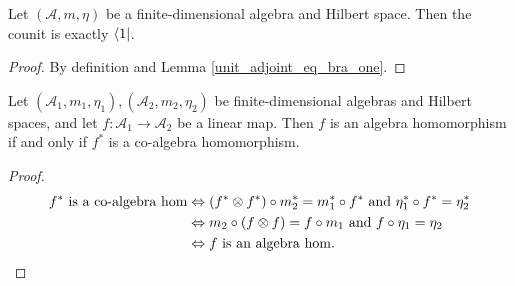  \begin{lemma}\label{counit_eq_bra_one}
  \leanok
  Let $(\mathcal{A},m,\eta)$ be a finite-dimensional algebra and Hilbert space. Then the counit is exactly $\left\langle1\right\rvert$.
 \end{lemma}
 \begin{proof}\leanok
  By definition and Lemma \ref{unit_adjoint_eq_bra_one}.
 \end{proof}

 \begin{proposition}\label{isAlgHom_iff_adjoint_isCoalgHom}
  \leanok
  Let $(\mathcal{A}_1,m_1,\eta_1),(\mathcal{A}_2,m_2,\eta_2)$ be finite-dimensional algebras and Hilbert spaces, and let $f\colon\mathcal{A}_1\to\mathcal{A}_2$ be a linear map. Then $f$ is an algebra homomorphism if and only if $f^*$ is a co-algebra homomorphism.
 \end{proposition}
 \begin{proof}\leanok
  \begin{align*}
   f^*\text{ is a co-algebra hom} &\Leftrightarrow (f^*\otimes f^*)\circ m_2^*=m_1^*\circ f^* \text{ and }\eta_1^*\circ f^*=\eta_2^*\\
   &\Leftrightarrow m_2\circ(f\otimes f)=f\circ m_1\text{ and }f\circ\eta_1=\eta_2\\
   &\Leftrightarrow f\text{ is an algebra hom}.
  \end{align*}
 \end{proof}

